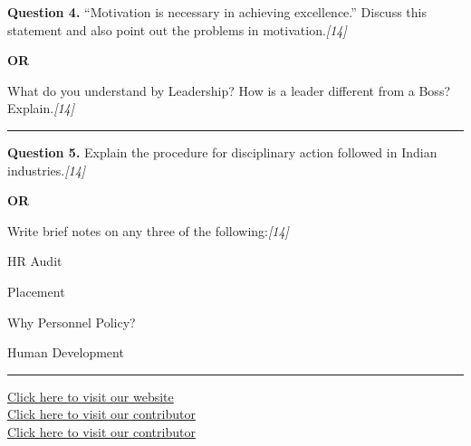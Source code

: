 \documentclass[11pt,a4paper]{article}
\newcommand{\pts}[1]{\hfill   \textit{[#1]}}
\begin{document}
\noindent   \textbf{Question 4.}
``Motivation is necessary in achieving excellence.'' Discuss this statement and also point out the problems in motivation.\pts{14}

\centerline{   \textbf{OR}}

What do you understand by Leadership? How is a leader different from a Boss? Explain.\pts{14}

\medskip\rule{\linewidth}{0.2pt}




\noindent   \textbf{Question 5.}
Explain the procedure for disciplinary action followed in Indian industries.\pts{14}

\centerline{   \textbf{OR}}

Write brief notes on any three of the following:\pts{14}

\begin{parts}
  \item HR Audit
  \item Placement
  \item Why Personnel Policy?
  \item Human Development
\end{parts}

\vfill
\rule{\linewidth}{0.4pt}

\begin{center}\small
\href{https://bhu-exam.vercel.app/}{Click here to visit our website}\\[4pt]
\href{https://me-aryan.vercel.app/}{Click here to visit our contributor}\\[4pt]
\href{https://quashan-me.vercel.app/}{Click here to visit our contributor}
\end{center}
\end{document}

